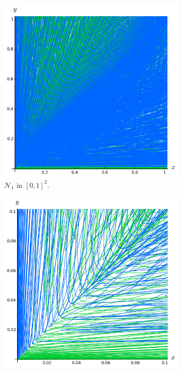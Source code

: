 \documentclass{beamer}
\begin{document}
\begin{frame}
\begin{figure}
\begin{subfigure}{.28\linewidth}
\includegraphics[width=1\textwidth]{plots/ch5_newCurves1.png}
\vspace{-0.1cm}\caption{$\mathcal{N}_1$ in $[0, 1]^2$.}
\end{subfigure} \hspace{0.4cm}
\begin{subfigure}{.28\linewidth}\centering
\includegraphics[width=1\textwidth]{plots/ch5_32_4curves2.png}

\end{subfigure}
\end{figure}
\end{frame}
\end{document}
